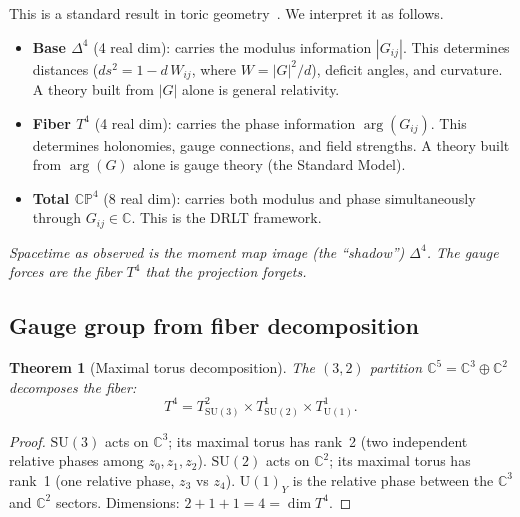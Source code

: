 \documentclass[12pt]{article}
\newtheorem{theorem}{Theorem}[section]
\theoremstyle{remark}
\theoremstyle{definition}
\newcommand{\CC}{\mathbb{C}}
\begin{document}
This is a standard result in toric geometry~\cite{fulton1993}.  We interpret it as follows.

\begin{itemize}
\item \textbf{Base $\Delta^4$} (4 real dim): carries the modulus information $|G_{ij}|$.  This determines distances ($ds^2 = 1 - d\,W_{ij}$, where $W = |G|^2/d$), deficit angles, and curvature.  A theory built from $|G|$ alone is general relativity.

\item \textbf{Fiber $T^4$} (4 real dim): carries the phase information $\arg(G_{ij})$.  This determines holonomies, gauge connections, and field strengths.  A theory built from $\arg(G)$ alone is gauge theory (the Standard Model).

\item \textbf{Total $\mathbb{CP}^4$} (8 real dim): carries both modulus and phase simultaneously through $G_{ij} \in \CC$.  This is the DRLT framework.
\end{itemize}

\noindent
\textit{Spacetime as observed is the moment map image (the ``shadow'') $\Delta^4$.  The gauge forces are the fiber $T^4$ that the projection forgets.}

\subsection{Gauge group from fiber decomposition}
\label{sec:toric_gauge}

\begin{theorem}[Maximal torus decomposition]
\label{thm:torus_decomposition}
The $(3,2)$ partition $\CC^5 = \CC^3 \oplus \CC^2$ decomposes the fiber:
\begin{equation}
T^4 = T^2_{\mathrm{SU}(3)} \times T^1_{\mathrm{SU}(2)} \times T^1_{\mathrm{U}(1)}.
\end{equation}
\end{theorem}

\begin{proof}
$\mathrm{SU}(3)$ acts on $\CC^3$; its maximal torus has rank~2 (two independent relative phases among $z_0, z_1, z_2$).  $\mathrm{SU}(2)$ acts on $\CC^2$; its maximal torus has rank~1 (one relative phase, $z_3$ vs $z_4$).  $\mathrm{U}(1)_Y$ is the relative phase between the $\CC^3$ and $\CC^2$ sectors.  Dimensions: $2 + 1 + 1 = 4 = \dim T^4$.
\end{proof}
\end{document}
